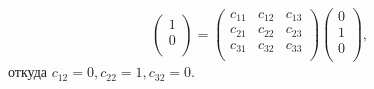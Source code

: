 \documentclass[a4paper,12pt]{article}
\theoremstyle{definition}
\begin{document}
\begin{itemize}[leftmargin=0.6cm]
\[\begin{pmatrix}
            1 \\
            0 \\
        \end{pmatrix}
        = 
        \begin{pmatrix}
            c_{11} & c_{12} & c_{13} \\
            c_{21} & c_{22} & c_{23} \\
            c_{31} & c_{32} & c_{33} \\
        \end{pmatrix}
        \begin{pmatrix}
            0 \\
            1 \\
            0 \\
        \end{pmatrix}
        ,\] 
        откуда \(c_{12} = 0, c_{22} = 1, c_{32} = 0\). 
            

\end{itemize}
\end{document}
